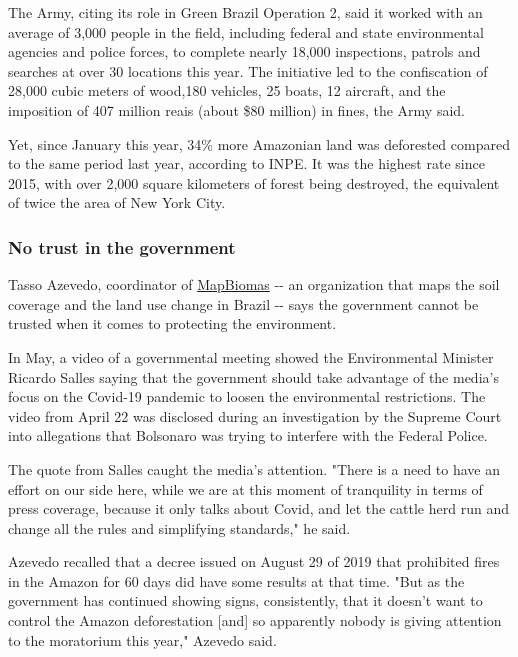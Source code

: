 The Army, citing its role in Green Brazil Operation 2, said it worked
with an average of 3,000 people in the field, including federal and
state environmental agencies and police forces, to complete nearly
18,000 inspections, patrols and searches at over 30 locations this year.
The initiative led to the confiscation of 28,000 cubic meters of
wood,180 vehicles, 25 boats, 12 aircraft, and the imposition of 407
million reais (about \$80 million) in fines, the Army said.

Yet, since January this year, 34\% more Amazonian land was deforested
compared to the same period last year, according to INPE. It was the
highest rate since 2015, with over 2,000 square kilometers of forest
being destroyed, the equivalent of twice the area of New York City.

\hypertarget{no-trust-in-the-government}{%
\subsubsection{No trust in the
government}\label{no-trust-in-the-government}}

Tasso Azevedo, coordinator of \href{https://mapbiomas.org/en}{MapBiomas}
-\/- an organization that maps the soil coverage and the land use change
in Brazil -\/- says the government cannot be trusted when it comes to
protecting the environment.

In May, a video of a governmental meeting showed the Environmental
Minister Ricardo Salles saying that the government should take advantage
of the media's focus on the Covid-19 pandemic to loosen the
environmental restrictions. The video from April 22 was disclosed during
an investigation by the Supreme Court into allegations that Bolsonaro
was trying to interfere with the Federal Police.

The quote from Salles caught the media's attention. "There is a need to
have an effort on our side here, while we are at this moment of
tranquility in terms of press coverage, because it only talks about
Covid, and let the cattle herd run and change all the rules and
simplifying standards," he said.

Azevedo recalled that a decree issued on August 29 of 2019 that
prohibited fires in the Amazon for 60 days did have some results at that
time. "But as the government has continued showing signs, consistently,
that it doesn't want to control the Amazon deforestation {[}and{]} so
apparently nobody is giving attention to the moratorium this year,"
Azevedo said.

